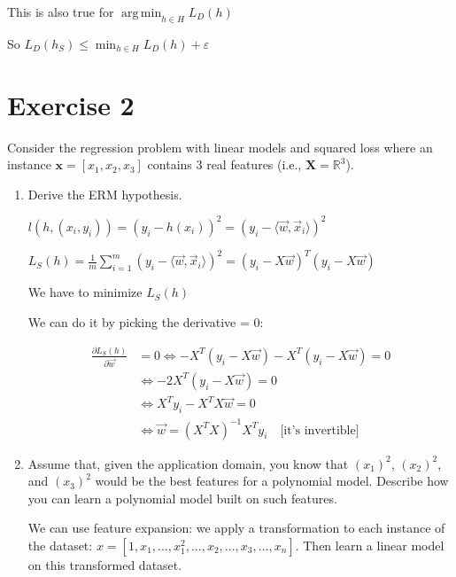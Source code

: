 \documentclass[a4paper,11pt,oneside]{book}
\DeclareMathOperator*{\argmin}{arg\,min}
\begin{document}
\begin{enumerate}
\begin{solution}
            This is also true for $\argmin_{h\in H} L_D(h)$

            So $L_D(h_S) \leq \min_{h\in H} L_D(h) + \varepsilon$
        \end{solution}      
    \end{enumerate}

\section{Exercise 2}
    Consider the regression problem with linear models and squared loss where an instance
    $\mathbf{x} = [x_1, x_2, x_3]$ contains 3 real features (i.e., $\mathbf{X} = \mathbb{R}^3$).
    \begin{enumerate}
        \item Derive the ERM hypothesis.
        \begin{solution}
            $l(h, (x_i,y_i)) = (y_i - h(x_i))^2 = (y_i - \langle \vec{w}, \vec{x}_i \rangle)^2$
            
            $L_S(h) = \frac{1}{m} \sum_{i=1}^m (y_i - \langle \vec{w}, \vec{x}_i \rangle)^2 = (y_i - X\vec{w})^T(y_i - X\vec{w})$
            
            We have to minimize $L_S(h)$
            
            We can do it by picking the derivative = 0:
            
            \begin{align*}
            \frac{\partial L_S(h)}{\partial \vec{w}} &= 0 \Leftrightarrow -X^T(y_i - X\vec{w}) - X^T(y_i - X\vec{w}) = 0 \\
            &\Leftrightarrow -2X^T(y_i - X\vec{w}) = 0 \\
            &\Leftrightarrow X^Ty_i - X^TX\vec{w} = 0 \\
            &\Leftrightarrow \vec{w} = (X^TX)^{-1}X^Ty_i \quad \text{[it's invertible]}
            \end{align*}
        \end{solution}
        \item Assume that, given the application domain, you know that $(x_1)^2$, $(x_2)^2$, and $(x_3)^2$ would be the best features for a polynomial model. Describe how you can learn a polynomial model built on such features.
        \begin{solution}
            We can use feature expansion: we apply a transformation to each instance of the dataset: $x = [1, x_1, ..., x_1^2, ..., x_2, ..., x_3, ..., x_n]$. Then learn a linear model on this transformed dataset.
        \end{solution}
    \end{enumerate}
\end{document}
